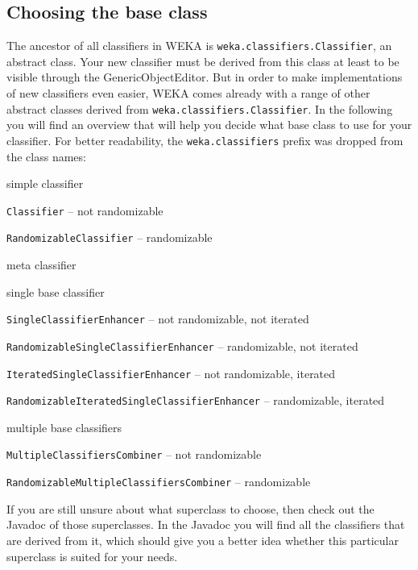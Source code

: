 \subsection{Choosing the base class}
The ancestor of all classifiers in WEKA is \texttt{weka.classifiers.Classifier},
an abstract class. Your new classifier must be derived from this class at
least to be visible through the GenericObjectEditor. But in order to
make implementations of new classifiers even easier, WEKA comes already with a
range of other abstract classes derived from
\texttt{weka.classifiers.Classifier}. In the following you will find an overview
that will help you decide what base class to use for your classifier. For better
readability, the \texttt{weka.classifiers} prefix was dropped from the class
names:
\begin{tight_itemize}
  \item simple classifier
	\begin{tight_itemize}
	  \item \texttt{Classifier} -- not randomizable
	  \item \texttt{RandomizableClassifier} -- randomizable
	\end{tight_itemize}
  \item meta classifier
	\begin{tight_itemize}
	  \item single base classifier
		\begin{tight_itemize}
		  \item \texttt{SingleClassifierEnhancer} -- not randomizable, not
iterated
		  \item \texttt{RandomizableSingleClassifierEnhancer} -- randomizable,
not iterated
		  \item \texttt{IteratedSingleClassifierEnhancer} -- not randomizable,
iterated
		  \item \texttt{RandomizableIteratedSingleClassifierEnhancer} --
randomizable, iterated
		\end{tight_itemize}
	  \item multiple base classifiers
		\begin{tight_itemize}
		  \item \texttt{MultipleClassifiersCombiner} -- not randomizable
		  \item \texttt{RandomizableMultipleClassifiersCombiner} -- randomizable
		\end{tight_itemize}
	\end{tight_itemize}
\end{tight_itemize}
If you are still unsure about what superclass to choose, then check out the
Javadoc of those superclasses. In the Javadoc you will find all the classifiers
that are derived from it, which should give you a better idea whether this
particular superclass is suited for your needs.

